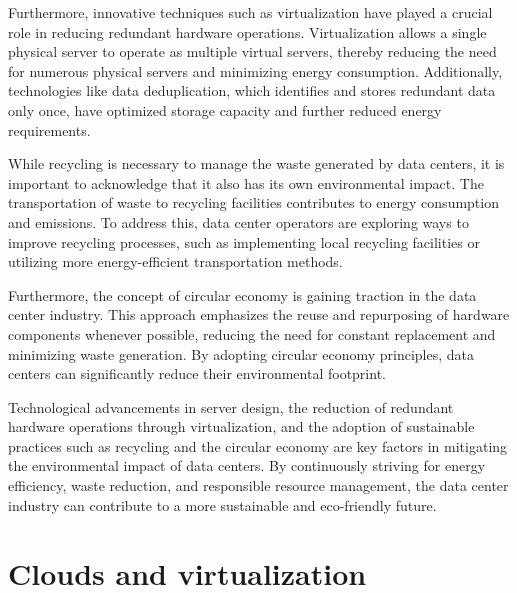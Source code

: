\documentclass[
  a4paper,  %
  twoside,  %
  bibliography=totoc,
  headsepline,
  cleardoublepage=empty,
  parskip=half,
  draft=false
]{scrbook}
\begin{document}
Furthermore, innovative techniques such as virtualization have played a crucial role in reducing redundant hardware operations. Virtualization allows a single physical server to operate as multiple virtual servers, thereby reducing the need for numerous physical servers and minimizing energy consumption. Additionally, technologies like data deduplication, which identifies and stores redundant data only once, have optimized storage capacity and further reduced energy requirements.

While recycling is necessary to manage the waste generated by data centers, it is important to acknowledge that it also has its own environmental impact. The transportation of waste to recycling facilities contributes to energy consumption and emissions. To address this, data center operators are exploring ways to improve recycling processes, such as implementing local recycling facilities or utilizing more energy-efficient transportation methods.

Furthermore, the concept of circular economy is gaining traction in the data center industry. This approach emphasizes the reuse and repurposing of hardware components whenever possible, reducing the need for constant replacement and minimizing waste generation. By adopting circular economy principles, data centers can significantly reduce their environmental footprint.

Technological advancements in server design, the reduction of redundant hardware operations through virtualization, and the adoption of sustainable practices such as recycling and the circular economy are key factors in mitigating the environmental impact of data centers. By continuously striving for energy efficiency, waste reduction, and responsible resource management, the data center industry can contribute to a more sustainable and eco-friendly future.



\chapter{Clouds and virtualization}
\end{document}
